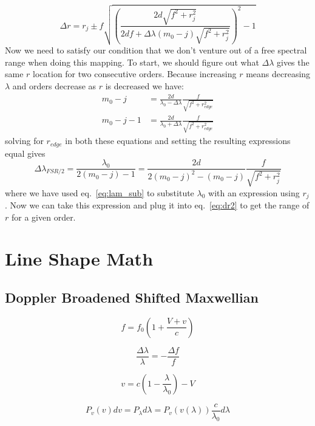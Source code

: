 \documentclass{article}
\begin{document}
\begin{equation}
\Delta r = r_{j} \pm f\sqrt{\left(\frac{2d\sqrt{f^{2}+r_{j}^{2}}}{2df+\Delta\lambda(m_{0}-j)\sqrt{f^{2}+r_{j}^{2}}}\right)^{2}-1}
\label{eq:dr2}
\end{equation}
Now we need to satisfy our condition that we don't venture out of a free spectral range when doing this mapping. To start, we should figure out what $\Delta\lambda$ gives the same $r$ location for two consecutive orders. Because increasing $r$ means decreasing $\lambda$ and orders decrease as $r$ is decreased we have:
\begin{align}
m_{0}-j&=\frac{2d}{\lambda_{0}-\Delta\lambda}\frac{f}{\sqrt{f^{2}+r_{edge}^{2}}}\\
m_{0}-j-1&=\frac{2d}{\lambda_{0}+\Delta\lambda}\frac{f}{\sqrt{f^{2}+r_{edge}^{2}}}
\end{align}
solving for $r_{edge}$ in both these equations and setting the resulting expressions equal gives
\begin{equation}
\Delta\lambda_{FSR/2}=\frac{\lambda_{0}}{2(m_{0}-j)-1}=\frac{2d}{2(m_{0}-j)^{2}-(m_{0}-j)}\frac{f}{\sqrt{f^{2}+r_{j}^{2}}}
\end{equation}
where we have used eq.~\ref{eq:lam_sub} to substitute $\lambda_{0}$ with an expression using $r_{j}$. Now we can take this expression and plug it into eq.~\ref{eq:dr2} to get the range of $r$ for a given order. 




\section{Line Shape Math}

\subsection{Doppler Broadened Shifted Maxwellian}

\begin{equation}
f = f_0 ( 1 + \frac{V+v}{c} )
\end{equation}

\begin{equation}
\frac{\Delta \lambda}{\lambda} = - \frac{\Delta f}{f}
\end{equation}

\begin{equation}
v = c (1 - \frac{\lambda}{\lambda_0}) - V
\end{equation}

\begin{equation}
P_v(v) dv = P_{\lambda} d \lambda = P_v ( v(\lambda) ) \frac{c}{\lambda_0} d\lambda
\end{equation}
\end{document}
